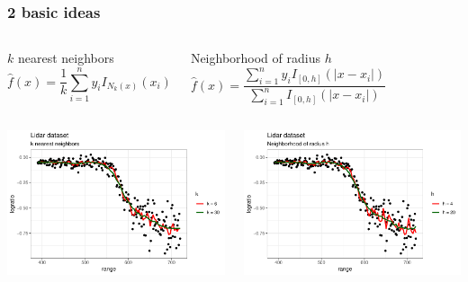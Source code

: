 \documentclass[pdf]{beamer}\usepackage[]{graphicx}\usepackage[]{color}
\makeatletter
\def\maxwidth{ %
  \ifdim\Gin@nat@width>\linewidth
    \linewidth
  \else
    \Gin@nat@width
  \fi
}
\newenvironment{knitrout}{}{} %
\makeatother
\begin{document}
\begin{frame}
\frametitle{2 basic ideas}
\begin{columns}
\begin{block}{$k$ nearest neighbors}
$$ \hat{f}(x) = \frac{1}{k} \sum_{i=1}^n y_i I_{N_k(x)}(x_i) $$

\end{block}
\begin{block}{Neighborhood of radius $h$}
$$\hat{f}(x) = \frac{\sum_{i=1}^n y_i I_{[0,h]}(|x-x_i|)}{\sum_{i=1}^n I_{[0,h]}(|x-x_i|)}$$

\end{block}
\end{columns}


\begin{columns}
\begin{knitrout}
\color{fgcolor}

{\centering \includegraphics[width=\maxwidth]{figure/lidarKnn-1} 

}



\end{knitrout}
\begin{knitrout}
\color{fgcolor}

{\centering \includegraphics[width=\maxwidth]{figure/lidarRadiusH-1} 

}
\end{knitrout}
\end{columns}
\end{frame}
\end{document}
